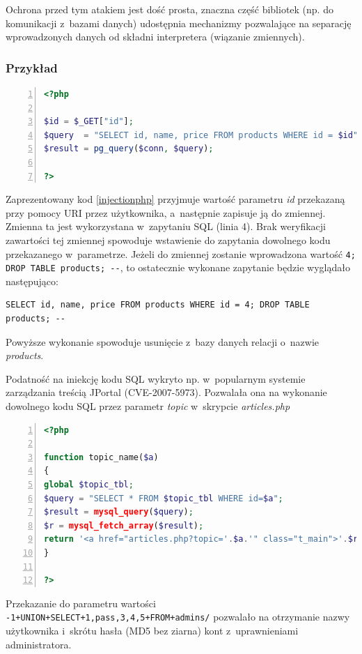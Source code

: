 \documentclass[12pt,a4paper,polish,thesis]{dcsbook}
\begin{document}
Ochrona przed tym atakiem jest dość prosta, znaczna część bibliotek (np. do komunikacji z~bazami danych) udostępnia mechanizmy pozwalające na separację wprowadzonych danych od składni interpretera (wiązanie zmiennych).

\subsubsection*{Przykład}
\begin{lstlisting}[language=php,frame=single,caption=kod podatny na iniekcję,label=injectionphp,numbers=left]
<?php

$id = $_GET["id"];
$query  = "SELECT id, name, price FROM products WHERE id = $id";
$result = pg_query($conn, $query);

?>
\end{lstlisting}
Zaprezentowany kod \ref{injectionphp} przyjmuje wartość parametru \textit{id} przekazaną przy pomocy URI przez użytkownika, a~następnie zapisuje ją do zmiennej. Zmienna ta jest wykorzystana w~zapytaniu SQL (linia 4). Brak weryfikacji zawartości tej zmiennej spowoduje wstawienie do zapytania dowolnego kodu przekazanego w~parametrze. Jeżeli do zmiennej zostanie wprowadzona wartość \lstinline[frame=single]|4; DROP TABLE products; --|, to ostatecznie wykonane zapytanie będzie wyglądało następująco: 
\begin{lstlisting}
SELECT id, name, price FROM products WHERE id = 4; DROP TABLE products; --
\end{lstlisting}
Powyższe wykonanie spowoduje usunięcie z~bazy danych relacji o~nazwie \textit{products}.

Podatność na iniekcję kodu SQL wykryto np. w~popularnym systemie zarządzania treścią JPortal (CVE-2007-5973). Pozwalała ona na wykonanie dowolnego kodu SQL przez parametr \textit{topic} w~skrypcie \textit{articles.php}

\begin{lstlisting}[language=php,frame=single,caption=podatność articles.php w~systemie JPortal,label=injectionjportal,numbers=left]
<?php

function topic_name($a)  
{     
global $topic_tbl; 
$query = "SELECT * FROM $topic_tbl WHERE id=$a"; 
$result = mysql_query($query);   
$r = mysql_fetch_array($result);     
return '<a href="articles.php?topic='.$a.'" class="t_main">'.$r['title'].'</a>';   
} 

?>
\end{lstlisting}

Przekazanie do parametru wartości \lstinline|-1+UNION+SELECT+1,pass,3,4,5+FROM+admins/| pozwalało na otrzymanie nazwy użytkownika i~skrótu hasła (MD5 bez ziarna) kont z~uprawnieniami administratora.
\end{document}
